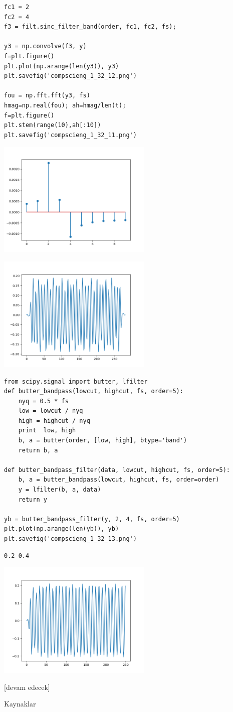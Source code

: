 \documentclass[12pt,fleqn]{article}\usepackage{../../common}
\begin{document}
\begin{verbatim}
fc1 = 2
fc2 = 4
f3 = filt.sinc_filter_band(order, fc1, fc2, fs);

y3 = np.convolve(f3, y)
f=plt.figure()
plt.plot(np.arange(len(y3)), y3)
plt.savefig('compscieng_1_32_12.png')

fou = np.fft.fft(y3, fs)
hmag=np.real(fou); ah=hmag/len(t);
f=plt.figure()
plt.stem(range(10),ah[:10])
plt.savefig('compscieng_1_32_11.png')
\end{verbatim}

\includegraphics[width=20em]{compscieng_1_32_11.png}

\includegraphics[width=20em]{compscieng_1_32_12.png}


\begin{verbatim}
from scipy.signal import butter, lfilter
def butter_bandpass(lowcut, highcut, fs, order=5):
    nyq = 0.5 * fs
    low = lowcut / nyq
    high = highcut / nyq
    print  low, high
    b, a = butter(order, [low, high], btype='band')
    return b, a

def butter_bandpass_filter(data, lowcut, highcut, fs, order=5):
    b, a = butter_bandpass(lowcut, highcut, fs, order=order)
    y = lfilter(b, a, data)
    return y

yb = butter_bandpass_filter(y, 2, 4, fs, order=5)
plt.plot(np.arange(len(yb)), yb)
plt.savefig('compscieng_1_32_13.png')
\end{verbatim}

\begin{verbatim}
0.2 0.4
\end{verbatim}

\includegraphics[width=20em]{compscieng_1_32_13.png}








[devam edecek]

Kaynaklar
\end{document}
